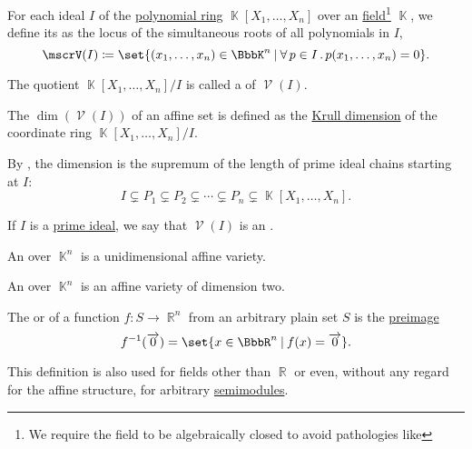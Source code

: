 \begin{definition}\label{def:affine_algebraic_set}
  For each ideal \( I \) of the \hyperref[def:polynomial_algebra]{polynomial ring} \( \BbbK[X_1, \ldots, X_n] \) over an  \hyperref[def:field]{field}\footnote{We require the field to be algebraically closed to avoid pathologies like } \( \BbbK \), we define its  as the locus of the simultaneous roots of all polynomials in \( I \),
  \begin{equation*}
    \mscrV(I) \coloneqq \set{ (x_1, \ldots, x_n) \in \BbbK^n \given \qforall {p \in I} p(x_1, \ldots, x_n) = 0 }.
  \end{equation*}

  \begin{thmenum}
     The quotient \( \BbbK[X_1, \ldots, X_n] / I \) is called a  of \( \mscrV(I) \).

     The  \( \dim(\mscrV(I)) \) of an affine set is defined as the \hyperref[def:krull_dimension]{Krull dimension} of the coordinate ring \( \BbbK[X_1, \ldots, X_n] / I \).

    By , the dimension is the supremum of the length of prime ideal chains starting at \( I \):
    \begin{equation*}
      I \subsetneq P_1 \subsetneq P_2 \subsetneq \cdots \subsetneq P_n \subsetneq \BbbK[X_1, \ldots, X_n].
    \end{equation*}

     If \( I \) is a \hyperref[def:semiring_ideal/prime]{prime ideal}, we say that \( \mscrV(I) \) is an .

     An  over \( \BbbK^n \) is a unidimensional affine variety.

     An  over \( \BbbK^n \) is an affine variety of dimension two.
  \end{thmenum}
\end{definition}

\begin{definition}\label{def:zero_locus}\mimprovised
  The  or  of a function \( f: S \to \BbbR^n \) from an arbitrary plain set \( S \) is the \hyperref[thm:def:function/preimage]{preimage}
  \begin{equation*}
    f^{-1}(\vect 0) = \set{ x \in \BbbR^n \given f(x) = \vect 0 }.
  \end{equation*}

  This definition is also used for fields other than \( \BbbR \) or even, without any regard for the affine structure, for arbitrary \hyperref[def:semimodule]{semimodules}.
\end{definition}

